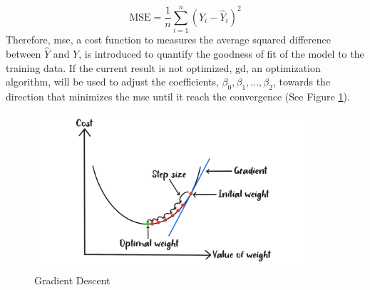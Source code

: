 \begin{equation} \label{eq:mse}
    \text{MSE} = \frac{1}{n} \sum_{i=1}^{n} (Y_i - \hat{Y}_i)^2
\end{equation}
Therefore, \gls{mse}, a cost function to measures the average squared difference between $\hat{Y}$ and $Y$, is introduced to quantify the goodness of fit of the model to the training data. 
If the current result is not optimized, \gls{gd}, an optimization algorithm, will be used to adjust the coefficients, $\beta_0, \beta_1,...,\beta_2$, towards the direction that minimizes the \gls{mse} until it reach the convergence (See Figure \ref{fig:gd}).
\begin{figure}[H]
    \centering
    \includegraphics[width=10cm]{Images/gd.png}
    \caption{Gradient Descent}
    \label{fig:gd}
\end{figure}
